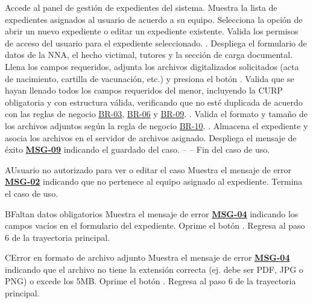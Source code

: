  \begin{UCtrayectoria}
 	\UCpaso[\UCactor] Accede al panel de gestión de expedientes del sistema.
 	\UCpaso Muestra la lista de expedientes asignados al usuario de acuerdo a su equipo.
 	\UCpaso[\UCactor] Selecciona la opción de abrir un nuevo expediente o editar un expediente existente.
 	\UCpaso Valida los permisos de acceso del usuario para el expediente seleccionado. .
 	\UCpaso Despliega el formulario de datos de la NNA, el hecho victimal, tutores y la sección de carga documental.
 	\UCpaso[\UCactor] Llena los campos requeridos, adjunta los archivos digitalizados solicitados (acta de nacimiento, cartilla de vacunación, etc.) y presiona el botón .
 	\UCpaso Valida que se hayan llenado todos los campos requeridos del menor, incluyendo la CURP obligatoria y con estructura válida, verificando que no esté duplicada de acuerdo con las reglas de negocio \hyperlink{BR-03}{BR-03}, \hyperlink{BR-06}{BR-06} y \hyperlink{BR-09}{BR-09}. .
 	\UCpaso Valida el formato y tamaño de los archivos adjuntos según la regla de negocio \hyperlink{BR-10}{BR-10}. .
 	\UCpaso Almacena el expediente y asocia los archivos en el servidor de archivos asignado.
 	\UCpaso Despliega el mensaje de éxito \hyperlink{mMSG09}{\bf MSG-09} indicando el guardado del caso.
 	\UCpaso[] -- -- Fin del caso de uso.
 \end{UCtrayectoria}

\begin{UCtrayectoriaA}{A}{Usuario no autorizado para ver o editar el caso}
	\UCpaso Muestra el mensaje de error \hyperlink{mMSG02}{\bf MSG-02} indicando que no pertenece al equipo asignado al expediente.
	\UCpaso Termina el caso de uso.
\end{UCtrayectoriaA}

\begin{UCtrayectoriaA}{B}{Faltan datos obligatorios}
	\UCpaso Muestra el mensaje de error \hyperlink{mMSG04}{\bf MSG-04} indicando los campos vacíos en el formulario del expediente.
	\UCpaso[\UCactor] Oprime el botón .
	\UCpaso Regresa al paso 6 de la trayectoria principal.
\end{UCtrayectoriaA}

\begin{UCtrayectoriaA}{C}{Error en formato de archivo adjunto}
	\UCpaso Muestra el mensaje de error \hyperlink{mMSG04}{\bf MSG-04} indicando que el archivo no tiene la extensión correcta (ej. debe ser PDF, JPG o PNG) o excede los 5MB.
	\UCpaso[\UCactor] Oprime el botón .
	\UCpaso Regresa al paso 6 de la trayectoria principal.
\end{UCtrayectoriaA}
